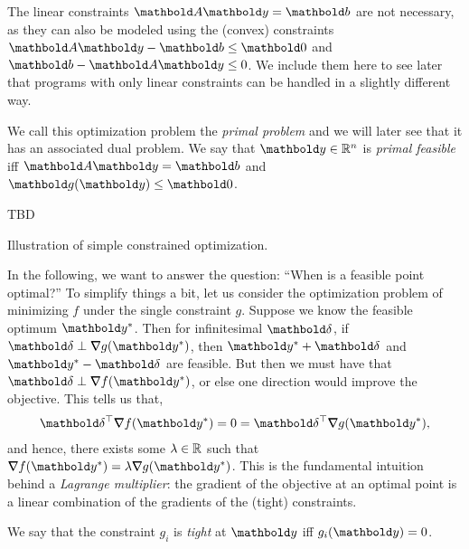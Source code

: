 \begin{rmk}
The linear constraints $\mA\vy = \vb$ are not necessary, as they can also be modeled using the (convex) constraints $\mA\vy - \vb \leq \vZero$ and $\vb - \mA\vy \leq 0$. We include them here to see later that programs with only linear constraints can be handled in a slightly different way.
\end{rmk}

We call this optimization problem the \emph{primal problem} and we will later see that it has an associated dual problem. We say that $\vy \in \R^n$ is \emph{primal feasible} iff $\mA\vy = \vb$ and $\vg(\vy) \leq \vZero$.

\begin{marginfigure}
TBD
\caption{Illustration of simple constrained optimization.}
\end{marginfigure}
In the following, we want to answer the question: ``When is a feasible point optimal?'' To simplify things a bit, let us consider the optimization problem of minimizing $f$ under the single constraint $g$. Suppose we know the feasible optimum $\s{\vy}$. Then for infinitesimal $\vdelta$, if $\vdelta \perp \grad g(\s{\vy})$, then $\s{\vy} + \vdelta$ and $\s{\vy} - \vdelta$ are feasible. But then we must have that $\vdelta \perp \grad f(\s{\vy})$, or else one direction would improve the objective. This tells us that, \begin{align*}
    \trans{\vdelta}\grad f(\s{\vy}) = 0 = \trans{\vdelta}\grad g(\s{\vy}),
\end{align*} and hence, there exists some $\lambda \in \mathbb{R}$ such that $\grad f(\s{\vy}) = \lambda \grad g(\s{\vy})$. This is the fundamental intuition behind a \emph{Lagrange multiplier}: the gradient of the objective at an optimal point is a linear combination of the gradients of the (tight) constraints.

We say that the constraint $g_i$ is \emph{tight} at $\vy$ iff $g_i(\vy) = 0$.

